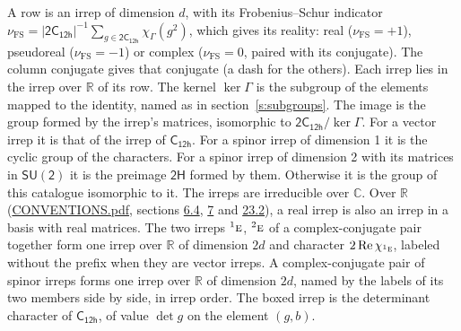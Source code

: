 \documentclass[10pt,a4paper]{article}
\numberwithin{equation}{section}
\newcommand{\grp}[1]{\mathsf{#1}}
\newcommand{\irr}[1]{\text{\normalfont\scshape #1}}
\newcommand{\conjpair}[1]{{}^{#1}}
\newcommand{\irchar}[1]{\chi_{#1}}
\newcommand{\fsind}{\nu_{\mathrm{FS}}}
\begin{document}
\leavevmode\label{n:index.frobenius}\label{n:head.irrep}\label{n:head.reality}A row is an irrep of dimension $d$, with its Frobenius--Schur indicator $\fsind = |\grp{2C_{12h}}|^{-1}\allowbreak\sum_{g\in\grp{2C_{12h}}}\irchar{\Gamma}(g^2)$, which gives its reality: real ($\fsind = +1$), pseudoreal ($\fsind = -1$) or complex ($\fsind = 0$, paired with its conjugate). \label{n:head.conjugate}The column conjugate gives that conjugate (a dash for the others). \label{n:head.over.real}Each irrep lies in the irrep over $\mathbb{R}$ of its row. \label{n:head.kernel}The kernel $\ker\Gamma$ is the subgroup of the elements mapped to the identity, named as in section~\ref{s:subgroups}. \label{n:head.image}The image is the group formed by the irrep's matrices, isomorphic to $\grp{2C_{12h}}/\ker\Gamma$. For a vector irrep it is that of the irrep of \href{../../../rotation/data/pdf/C12h.pdf}{$\grp{C_{12h}}$}. For a spinor irrep of dimension 1 it is the cyclic group of the characters. For a spinor irrep of dimension 2 with its matrices in $\grp{SU(2)}$ it is the preimage $\grp{2H}$ formed by them. Otherwise it is the group of this catalogue isomorphic to it. The irreps are irreducible over $\mathbb{C}$. Over $\mathbb{R}$ (\href{../../CONVENTIONS.pdf}{CONVENTIONS.pdf}, sections \href{../../../rotation/CONVENTIONS.pdf\#conv.6.4}{6.4}, \href{../../../rotation/CONVENTIONS.pdf\#conv.7}{7} and \href{../../CONVENTIONS.pdf\#conv.23.2}{23.2}), a real irrep is also an irrep in a basis with real matrices. The two irreps $\conjpair{1}\irr{e}$, $\conjpair{2}\irr{e}$ of a complex-conjugate pair together form one irrep over $\mathbb{R}$ of dimension $2d$ and character $2\operatorname{Re}\irchar{\conjpair{1}\irr{e}}$, labeled without the prefix when they are vector irreps. A complex-conjugate pair of spinor irreps forms one irrep over $\mathbb{R}$ of dimension $2d$, named by the labels of its two members side by side, in irrep order. \label{n:mark.determinant}The boxed irrep is the determinant character of \href{../../../rotation/data/pdf/C12h.pdf}{$\grp{C_{12h}}$}, of value $\det g$ on the element $(g, b)$.
\setlength{\emergencystretch}{2em}\par\setlength{\emergencystretch}{0pt}
\end{document}
